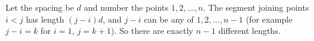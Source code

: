 Let the spacing be $d$ and number the points $1,2,\dots,n$. The segment joining points $i<j$ has length $(j-i)d$, and $j-i$ can be any of $1,2,\dots,n-1$ (for example $j-i=k$ for $i=1$, $j=k+1$). So there are exactly $\boxed{n-1}$ different lengths.
